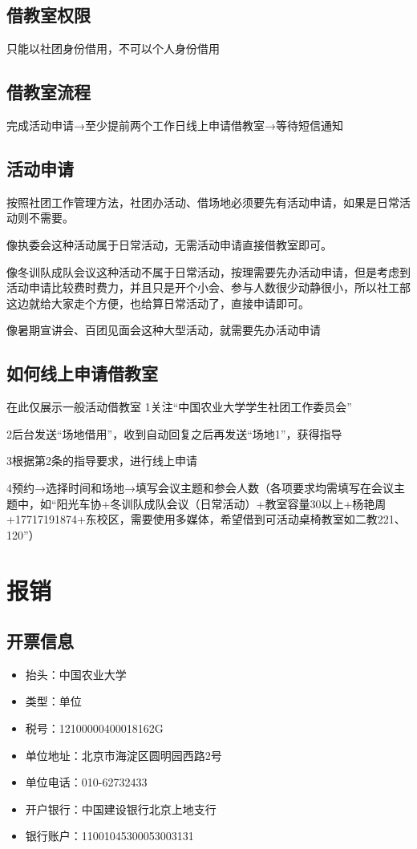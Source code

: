 \documentclass{ctexbook}
\begin{document}
\subsection{借教室权限}
只能以社团身份借用，不可以个人身份借用
\subsection{借教室流程}
完成活动申请→至少提前两个工作日线上申请借教室→等待短信通知
\subsection{活动申请}
按照社团工作管理方法，社团办活动、借场地必须要先有活动申请，如果是日常活动则不需要。

像执委会这种活动属于日常活动，无需活动申请直接借教室即可。

像冬训队成队会议这种活动不属于日常活动，按理需要先办活动申请，但是考虑到活动申请比较费时费力，并且只是开个小会、参与人数很少动静很小，所以社工部这边就给大家走个方便，也给算日常活动了，直接申请即可。

像暑期宣讲会、百团见面会这种大型活动，就需要先办活动申请
\subsection{如何线上申请借教室}
在此仅展示一般活动借教室
1关注“中国农业大学学生社团工作委员会”

2后台发送“场地借用”，收到自动回复之后再发送“场地1”，获得指导

3根据第2条的指导要求，进行线上申请

4预约→选择时间和场地→填写会议主题和参会人数（各项要求均需填写在会议主题中，如“阳光车协+冬训队成队会议（日常活动）+教室容量30以上+杨艳周+17717191874+东校区，需要使用多媒体，希望借到可活动桌椅教室如二教221、120”）

\section{报销}
\subsection{开票信息}
\begin{itemize}
    \item 抬头：中国农业大学
    \item 类型：单位
    \item 税号：12100000400018162G
    \item 单位地址：北京市海淀区圆明园西路2号
    \item 单位电话：010-62732433
    \item 开户银行：中国建设银行北京上地支行
    \item 银行账户：11001045300053003131
\end{itemize}
\end{document}

